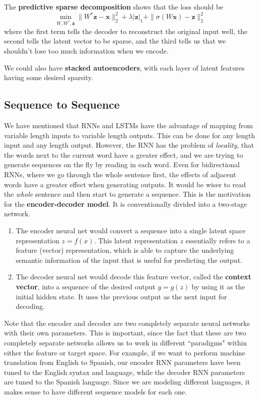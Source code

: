 \documentclass{article}
\begin{document}
  The \textbf{predictive sparse decomposition} shows that the loss should be 
  \begin{equation}
    \min_{W, W^\ast, \mathbf{z}} \|W^\ast \mathbf{z} - \mathbf{x}\|^2_2 + \lambda | \mathbf{z}|_1 + \|\sigma(W \mathbf{x}) - \mathbf{z}\|^2_2
  \end{equation}
  where the first term tells the decoder to reconstruct the original input well, the second tells the latent vector to be sparse, and the third tells us that we shouldn't lose too much information when we encode. 

  We could also have \textbf{stacked autoencoders}, with each layer of latent features having some desired sparsity. 

\subsection{Sequence to Sequence}

  We have mentioned that RNNs and LSTMs have the advantage of mapping from variable length inputs to variable length outputs. This can be done for any length input and any length output. However, the RNN has the problem of \textit{locality}, that the words next to the current word have a greater effect, and we are trying to generate sequences on the fly by reading in each word. Even for bidirectional RNNs, where we go through the whole sentence first, the effects of adjacent words have a greater effect when generating outputs. It would be wiser to read the \textit{whole} sentence and then start to generate a sequence. This is the motivation for the \textbf{encoder-decoder model}. It is conventionally divided into a two-stage network. 
  \begin{enumerate}
    \item The encoder neural net would convert a sequence into a single latent space representation $z = f(x)$. This latent representation $z$ essentially refers to a feature (vector) representation, which is able to capture the underlying semantic information of the input that is useful for predicting the output. 
    \item The decoder neural net would decode this feature vector, called the \textbf{context vector}, into a sequence of the desired output $y = g(z)$ by using it as the initial hidden state. It uses the previous output as the next input for decoding. 
  \end{enumerate}
  Note that the encoder and decoder are two completely separate neural networks with their own parameters. This is important, since the fact that these are two completely separate networks allows us to work in different ``paradigms" within either the feature or target space. For example, if we want to perform machine translation from English to Spanish, our encoder RNN parameters have been tuned to the English syntax and language, while the decoder RNN parameters are tuned to the Spanish language. Since we are modeling different languages, it makes sense to have different sequence models for each one. 
\end{document}
